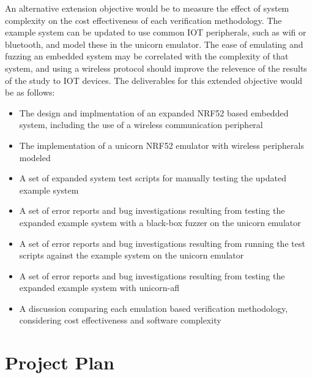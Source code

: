 \documentclass[11pt]{article}
\begin{document}
An alternative extension objective would be to measure the effect of system
complexity on the cost effectiveness of each verification methodology.
The example system can be updated to use common IOT peripherals, such as wifi
or bluetooth, and model these in the unicorn emulator. The ease of emulating
and fuzzing an embedded system may be correlated with the complexity of that
system, and using a wireless protocol should improve the relevence of the
results of the study to IOT devices. The deliverables for this extended objective would be as follows:

\begin{itemize}
\item The design and implmentation of an expanded NRF52 based embedded system, including the use of a wireless communication peripheral
\item The implementation of a unicorn NRF52 emulator with wireless peripherals modeled
\item A set of expanded system test scripts for manually testing the updated example system
\item A set of error reports and bug investigations resulting from testing the expanded example system with a black-box fuzzer on the unicorn emulator
\item A set of error reports and bug investigations resulting from running the test scripts against the example system on the unicorn emulator
\item A set of error reports and bug investigations resulting from testing the expanded example system with unicorn-afl
\item A discussion comparing each emulation based verification methodology, considering cost effectiveness and software complexity
\end{itemize}


\pagebreak
\section{Project Plan} \label{sec:3}




\end{document}
